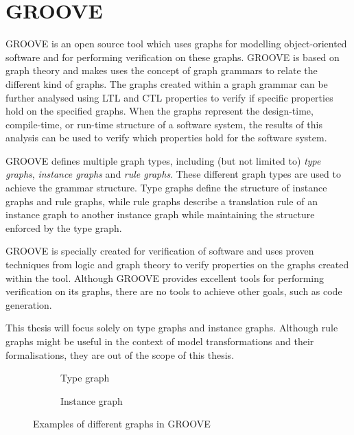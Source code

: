 \section{GROOVE}
\label{sec:background:groove}

GROOVE \cite{groove} is an open source tool which uses graphs for modelling object-oriented software and for performing verification on these graphs. GROOVE is based on graph theory and makes uses the concept of graph grammars to relate the different kind of graphs. The graphs created within a graph grammar can be further analysed using LTL and CTL properties to verify if specific properties hold on the specified graphs. When the graphs represent the design-time, compile-time, or run-time structure of a software system, the results of this analysis can be used to verify which properties hold for the software system.

GROOVE defines multiple graph types, including (but not limited to) \textit{type graphs}, \textit{instance graphs} and \textit{rule graphs}. These different graph types are used to achieve the grammar structure. Type graphs define the structure of instance graphs and rule graphs, while rule graphs describe a translation rule of an instance graph to another instance graph while maintaining the structure enforced by the type graph.

GROOVE is specially created for verification of software and uses proven techniques from logic and graph theory to verify properties on the graphs created within the tool. Although GROOVE provides excellent tools for performing verification on its graphs, there are no tools to achieve other goals, such as code generation.

This thesis will focus solely on type graphs and instance graphs. Although rule graphs might be useful in the context of model transformations and their formalisations, they are out of the scope of this thesis.

\begin{figure}[H]
    \centering
    \begin{subfigure}{0.45\textwidth}
        \centering
        
        \caption{Type graph}
        \label{fig:introduction:groove:type_graph}
    \end{subfigure}
    \begin{subfigure}{0.45\textwidth}
        \centering
        
        \caption{Instance graph}
        \label{fig:introduction:groove:instance_graph}
    \end{subfigure}
    \caption{Examples of different graphs in GROOVE}
    \label{fig:introduction:groove:graphs}
\end{figure}

